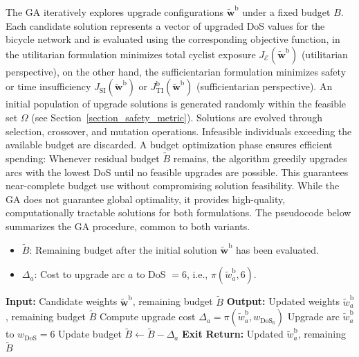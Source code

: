 \documentclass[lettersize,journal]{IEEEtran}
\begin{document}
The GA iteratively explores upgrade configurations $\tilde{\boldsymbol{w}}^\mathrm{b}$ under a fixed budget $B$. Each candidate solution represents a vector of upgraded DoS values for the bicycle network and is evaluated using the corresponding objective function, in the utilitarian formulation minimizes total cyclist exposure $J_{\mathcal{E}}(\tilde{\boldsymbol{w}}^\mathrm{b})$ (utilitarian perspective), on the other hand, the sufficientarian formulation minimizes safety or time insufficiency $J_{\mathrm{SI}}(\tilde{\boldsymbol{w}}^\mathrm{b})$ or $J_{\mathrm{TI}}^\mathrm{b}(\tilde{\boldsymbol{w}}^\mathrm{b})$ (sufficientarian perspective). An initial population of upgrade solutions is generated randomly within the feasible set $\Omega$ (see Section~\ref{section_safety_metric}). Solutions are evolved through selection, crossover, and mutation operations. Infeasible individuals exceeding the available budget are discarded. A budget optimization phase ensures efficient spending: Whenever residual budget $\tilde{B}$ remains, the algorithm greedily upgrades arcs with the lowest DoS until no feasible upgrades are possible. This guarantees near-complete budget use without compromising solution feasibility. While the GA does not guarantee global optimality, it provides high-quality, computationally tractable solutions for both formulations. The pseudocode below summarizes the GA procedure, common to both variants.
\begin{itemize}
    \item $\tilde{B}$: Remaining budget after the initial solution $\tilde{\boldsymbol{w}}^\mathrm{b}$ has been evaluated.
    \item $\Delta_a$: Cost to upgrade arc $a$ to DoS $=6$, i.e., $\pi(\tilde{w}_a^\mathrm{b}, 6)$.
\end{itemize}
\begin{algorithm}[H]
\caption{Genetic Algorithm}
\label{pseudocode:GA}
\footnotesize
\begin{algorithmic}[1]
\State \textbf{Input:} Candidate weights $\tilde{\boldsymbol{w}}^\mathrm{b}$, remaining budget $\tilde{B}$
\State \textbf{Output:} Updated weights $\tilde{w}_a^\mathrm{b}$, remaining budget $\tilde{B}$
    \State Compute upgrade cost $\Delta_a = \pi(\tilde{w}_a^\mathrm{b}, w_{\text{DoS}_6})$
        \State Upgrade arc $\tilde{w}_a^\mathrm{b}$ to $w_{\text{DoS}} = 6$
        \State Update budget $\tilde{B} \gets \tilde{B} - \Delta_a$
    \EndIf
        \State \textbf{Exit}
    \EndIf
\EndFor
\State \textbf{Return:} Updated $\tilde{w}_a^\mathrm{b}$, remaining $\tilde{B}$
\end{algorithmic}
\end{algorithm}
\end{document}
